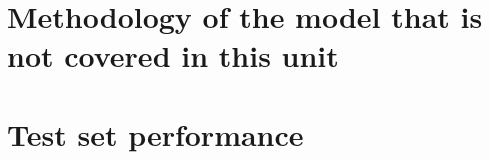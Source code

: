 \documentclass[letterpaper,12pt,twoside,]{pinp}
\begin{document}
\hypertarget{methodology-of-the-model-that-is-not-covered-in-this-unit}{%
\section{Methodology of the model that is not covered in this
unit}\label{methodology-of-the-model-that-is-not-covered-in-this-unit}}

\hypertarget{test-set-performance}{%
\section{Test set performance}\label{test-set-performance}}



\renewcommand\refname{Analysis and conclusions}


\end{document}
